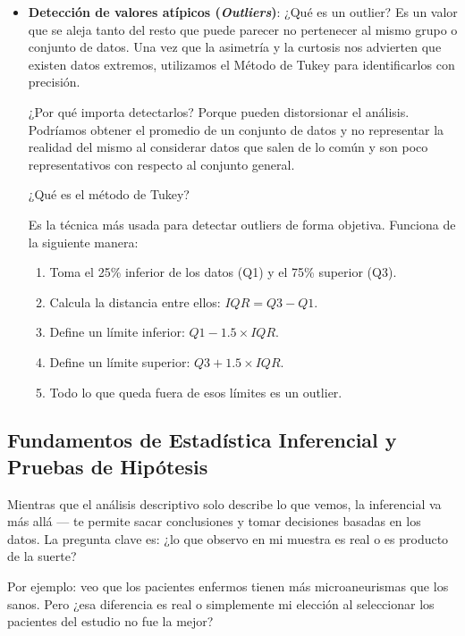 \begin{itemize}
    \item \textbf{Detección de valores atípicos (\textit{Outliers})}: ¿Qué es un outlier? Es un valor que se aleja tanto del resto que puede parecer no pertenecer al mismo grupo o conjunto de datos. Una vez que la asimetría y la curtosis nos advierten que existen datos extremos, utilizamos el Método de Tukey para identificarlos con precisión.
    
    ¿Por qué importa detectarlos? Porque pueden distorsionar el análisis. Podríamos obtener el promedio de un conjunto de datos y no representar la realidad del mismo al considerar datos que salen de lo común y son poco representativos con respecto al conjunto general.

    ¿Qué es el método de Tukey?

    Es la técnica más usada para detectar outliers de forma objetiva. Funciona de la siguiente manera:

    \begin{enumerate}
        \item Toma el 25\% inferior de los datos (Q1) y el 75\% superior (Q3).
        \item Calcula la distancia entre ellos: $IQR = Q3 - Q1$.
        \item Define un límite inferior: $Q1 - 1.5 \times IQR$.
        \item Define un límite superior: $Q3 + 1.5 \times IQR$.
        \item Todo lo que queda fuera de esos límites es un outlier.
    \end{enumerate}
\end{itemize}

\subsection{Fundamentos de Estadística Inferencial y Pruebas de Hipótesis}

  Mientras que el análisis descriptivo solo describe lo que vemos, la inferencial va más allá — te permite sacar conclusiones y tomar decisiones basadas en los datos. La pregunta clave es: ¿lo 
  que observo en mi muestra es real o es producto de la suerte?                                                                                                                         
   
  Por ejemplo: veo que los pacientes enfermos tienen más microaneurismas que los sanos. Pero ¿esa diferencia es real o simplemente mi elección al seleccionar los pacientes del estudio no fue la mejor?                                                                                                                                                                        
                                                                                                                                                                                    
